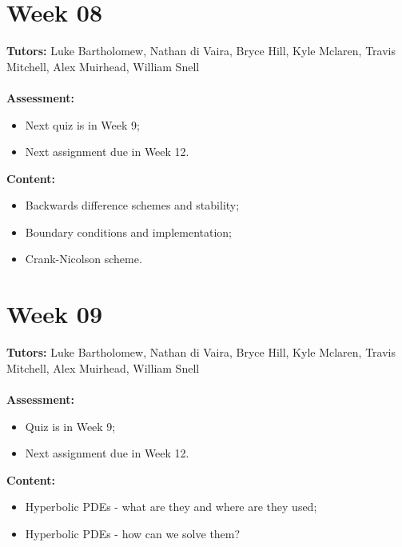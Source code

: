 \documentclass[11pt,a4paper]{report}
\begin{document}
	
	\begingroup
	\makeatletter
	\let\clearpage\relax
	\vspace*{\fill}%
	\vspace*{\dimexpr-50\p@-\baselineskip}
	\chapter*{Week 08}
	\textbf{Tutors:} Luke Bartholomew, Nathan di Vaira, Bryce Hill, Kyle Mclaren, Travis Mitchell, Alex Muirhead, William Snell \\\\
	\textbf{Assessment:} 
	\begin{itemize}
		\item Next quiz is in Week 9;
		\item Next assignment due in Week 12. 
	\end{itemize}	
	\textbf{Content:}
	\begin{itemize}
		\item Backwards difference schemes and stability;
		\item Boundary conditions and implementation;
		\item Crank-Nicolson scheme.
	\end{itemize}
	\vspace*{\fill}
	\endgroup
	
	
	
	\begingroup
	\makeatletter
	\let\clearpage\relax
	\vspace*{\fill}%
	\vspace*{\dimexpr-50\p@-\baselineskip}
	\chapter*{Week 09}
	\textbf{Tutors:} Luke Bartholomew, Nathan di Vaira, Bryce Hill, Kyle Mclaren, Travis Mitchell, Alex Muirhead, William Snell \\\\
	\textbf{Assessment:} 
	\begin{itemize}
		\item Quiz is in Week 9;
		\item Next assignment due in Week 12. 
	\end{itemize}	
	\textbf{Content:}
	\begin{itemize}
		\item Hyperbolic PDEs - what are they and where are they used;
		\item Hyperbolic PDEs - how can we solve them?
	\end{itemize}
	\vspace*{\fill}
	\endgroup
	
	
\end{document}
